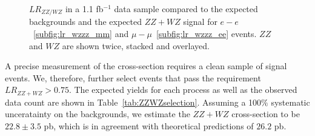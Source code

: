 \documentclass{cmspaper}
\begin{document}
\begin{figure}[!htbp]
\begin{center}
\caption{$LR_{ZZ/WZ}$ in a 1.1 fb$^{-1}$ data sample compared to the expected backgrounds and the expected
$ZZ+WZ$ signal for $e-e$~\ref{subfig:lr_wzzz_mm} and $\mu-\mu$~\ref{subfig:lr_wzzz_ee} events. $ZZ$ and $WZ$ are shown twice, stacked and overlayed.}
\label{fig:lrzz}
\end{center}
\end{figure}

A precise measurement of the cross-section requires a clean sample of signal events. We, therefore, further select events
that pass the requirement $LR_{ZZ+WZ}>0.75$.  The expected yields for each process as well as the observed data count
are  shown in Table~\ref{tab:ZZWZselection}.
Assuming a 100$\%$ systematic unceratainty on the backgrounds, we estimate the $ZZ+WZ$ 
cross-section to be $22.8 \pm 3.5$ pb, which is in agreement with theoretical predictions of $26.2$ pb.
\end{document}
